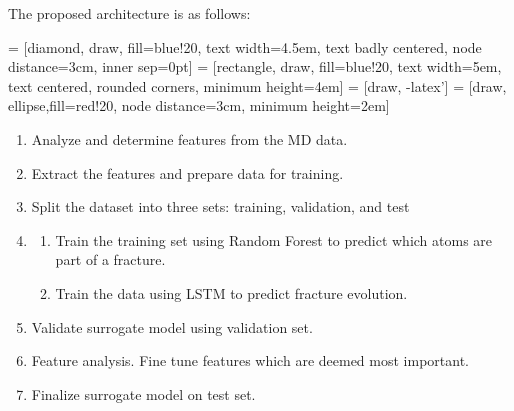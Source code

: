 The proposed architecture is as follows:

\bigskip

\begin{center}
 = [diamond, draw, fill=blue!20, 
    text width=4.5em, text badly centered, node distance=3cm, inner sep=0pt]
 = [rectangle, draw, fill=blue!20, 
    text width=5em, text centered, rounded corners, minimum height=4em]
 = [draw, -latex']
 = [draw, ellipse,fill=red!20, node distance=3cm,
    minimum height=2em]
    
\end{center}

\begin{enumerate}
    \item Analyze and determine features from the MD data.
    \item Extract the features and prepare data for training.
    \item Split the dataset into three sets: training, validation, and test
    \item
    \begin{enumerate}
        \item Train the training set using Random Forest to predict which atoms are part of a fracture.
        \item Train the data using LSTM to predict fracture evolution.
    \end{enumerate}
    \item Validate surrogate model using validation set.
    \item Feature analysis. Fine tune features which are deemed most important. 
    \item Finalize surrogate model on test set. 
\end{enumerate}